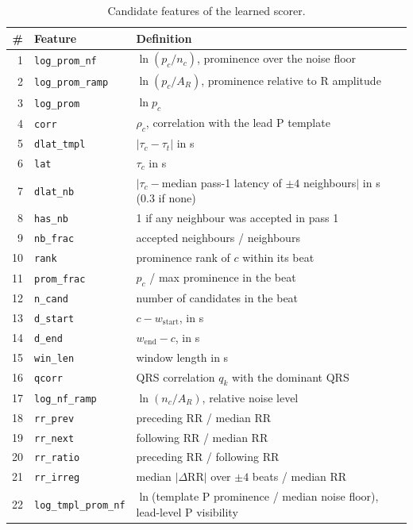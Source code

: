 \documentclass[11pt,a4paper]{article}
\newcommand{\code}[1]{\texttt{#1}}
\begin{document}
\begin{table}[htbp]
\centering\small
\caption{Candidate features of the learned scorer.}
\label{tab:features}
\begin{tabularx}{\textwidth}{rlL}
\toprule
\# & Feature & Definition \\
 & \code{log\_prom\_nf} & $\ln(p_c / n_c)$, prominence over the noise floor \\
2 & \code{log\_prom\_ramp} & $\ln(p_c / A_R)$, prominence relative to R amplitude \\
3 & \code{log\_prom} & $\ln p_c$ \\
4 & \code{corr} & $\rho_c$, correlation with the lead P template \\
5 & \code{dlat\_tmpl} & $|\tau_c - \tau_t|$ in s \\
6 & \code{lat} & $\tau_c$ in s \\
7 & \code{dlat\_nb} & $|\tau_c - {}$median pass-1 latency of $\pm4$ neighbours$|$ in s (0.3 if none) \\
8 & \code{has\_nb} & 1 if any neighbour was accepted in pass 1 \\
9 & \code{nb\_frac} & accepted neighbours / neighbours \\
10 & \code{rank} & prominence rank of $c$ within its beat \\
11 & \code{prom\_frac} & $p_c$ / max prominence in the beat \\
12 & \code{n\_cand} & number of candidates in the beat \\
13 & \code{d\_start} & $c - w_\mathrm{start}$, in s \\
14 & \code{d\_end} & $w_\mathrm{end} - c$, in s \\
15 & \code{win\_len} & window length in s \\
16 & \code{qcorr} & QRS correlation $q_k$ with the dominant QRS \\
17 & \code{log\_nf\_ramp} & $\ln(n_c / A_R)$, relative noise level \\
18 & \code{rr\_prev} & preceding RR / median RR \\
19 & \code{rr\_next} & following RR / median RR \\
20 & \code{rr\_ratio} & preceding RR / following RR \\
21 & \code{rr\_irreg} & median $|\Delta\mathrm{RR}|$ over $\pm4$ beats / median RR \\
22 & \code{log\_tmpl\_prom\_nf} & $\ln$(template P prominence / median noise floor), lead-level P visibility \\
\bottomrule
\end{tabularx}
\end{table}
\end{document}
